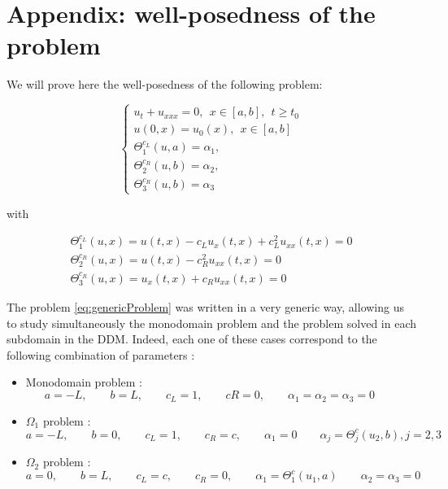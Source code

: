\section{Appendix: well-posedness of the problem}

\indent We will prove here the well-posedness of the following problem:

\begin{equation}
    \label{eq:genericProblem}
    \begin{cases}
        u_t + u_{xxx} = 0 , \ \ x \in [a,b], \ \ t \geq t_0\\
        u(0,x)  = u_0(x) , \ \ x \in [a,b] \\
        \Theta_1^{c_L}(u,a) = \alpha_1, \\ 
        \Theta_2^{c_R}(u,b) = \alpha_2, \\
        \Theta_3^{c_R}(u,b) = \alpha_3
     \end{cases}
\end{equation}

\noindent with

\begin{equation}
    \begin{gathered}
        \Theta_1^{c_L}(u,x) = u(t,x) - c_L u_x(t,x)  + c_L^2  u_{xx}(t,x) = 0 \\
        \Theta_2^{c_R}(u,x) =  u(t,x) - c_R^2    u_{xx}(t,x) = 0\\
        \Theta_3^{c_R} (u,x)= u_x(t,x) + c_R u_{xx}(t,x)  = 0
    \end{gathered}
\end{equation}

\indent The problem  \eqref{eq:genericProblem} was written in a very generic way, allowing us to study simultaneously the monodomain problem and the problem solved in each subdomain in the DDM. Indeed, each one of these cases correspond to the following combination of parameters :

\begin{itemize}
	\item Monodomain problem :
		\begin{equation*}
			a = -L, \qquad
			b = L, \qquad
			c_L = 1, \qquad
			cR = 0, \qquad
			\alpha_1 = \alpha_2 = \alpha_3 = 0 \qquad
		\end{equation*}
		
	\item $\Omega_1$ problem :
		\begin{equation*}
			a = -L, \qquad
			b = 0, \qquad
			c_L = 1, \qquad
			c_R = c, \qquad
			\alpha_1 = 0 \qquad
			\alpha_j = \Theta_j^{c}(u_2,b),  j=2,3\qquad
		\end{equation*}
		
	\item $\Omega_2$ problem :
		\begin{equation*}
			a = 0, \qquad
			b = L, \qquad
			c_L = c, \qquad
			c_R = 0, \qquad
			\alpha_1 =\Theta_1^{c}(u_1,a) \qquad
			\alpha_2 = \alpha_3 = 0 \qquad
		\end{equation*}
\end{itemize}

